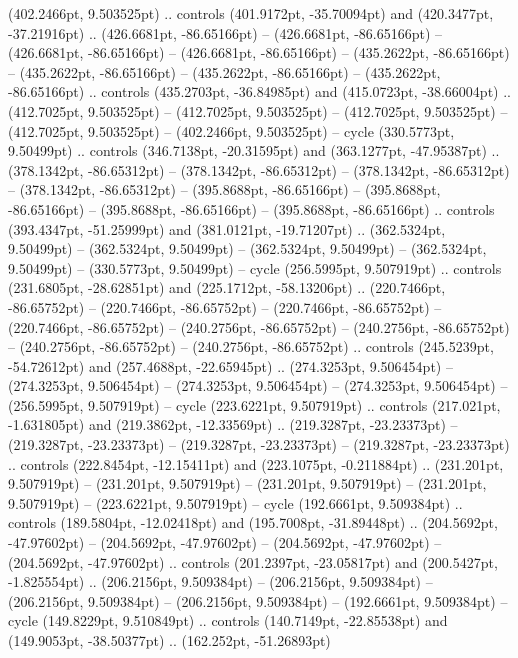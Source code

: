 (402.2466pt, 9.503525pt) .. controls (401.9172pt, -35.70094pt) and (420.3477pt, -37.21916pt) .. (426.6681pt, -86.65166pt)
 -- (426.6681pt, -86.65166pt)
 -- (426.6681pt, -86.65166pt)
 -- (426.6681pt, -86.65166pt)
 -- (435.2622pt, -86.65166pt)
 -- (435.2622pt, -86.65166pt)
 -- (435.2622pt, -86.65166pt)
 -- (435.2622pt, -86.65166pt) .. controls (435.2703pt, -36.84985pt) and (415.0723pt, -38.66004pt) .. (412.7025pt, 9.503525pt)
 -- (412.7025pt, 9.503525pt)
 -- (412.7025pt, 9.503525pt)
 -- (412.7025pt, 9.503525pt)
 -- (402.2466pt, 9.503525pt) -- cycle
(330.5773pt, 9.50499pt) .. controls (346.7138pt, -20.31595pt) and (363.1277pt, -47.95387pt) .. (378.1342pt, -86.65312pt)
 -- (378.1342pt, -86.65312pt)
 -- (378.1342pt, -86.65312pt)
 -- (378.1342pt, -86.65312pt)
 -- (395.8688pt, -86.65166pt)
 -- (395.8688pt, -86.65166pt)
 -- (395.8688pt, -86.65166pt)
 -- (395.8688pt, -86.65166pt) .. controls (393.4347pt, -51.25999pt) and (381.0121pt, -19.71207pt) .. (362.5324pt, 9.50499pt)
 -- (362.5324pt, 9.50499pt)
 -- (362.5324pt, 9.50499pt)
 -- (362.5324pt, 9.50499pt)
 -- (330.5773pt, 9.50499pt) -- cycle
(256.5995pt, 9.507919pt) .. controls (231.6805pt, -28.62851pt) and (225.1712pt, -58.13206pt) .. (220.7466pt, -86.65752pt)
 -- (220.7466pt, -86.65752pt)
 -- (220.7466pt, -86.65752pt)
 -- (220.7466pt, -86.65752pt)
 -- (240.2756pt, -86.65752pt)
 -- (240.2756pt, -86.65752pt)
 -- (240.2756pt, -86.65752pt)
 -- (240.2756pt, -86.65752pt) .. controls (245.5239pt, -54.72612pt) and (257.4688pt, -22.65945pt) .. (274.3253pt, 9.506454pt)
 -- (274.3253pt, 9.506454pt)
 -- (274.3253pt, 9.506454pt)
 -- (274.3253pt, 9.506454pt)
 -- (256.5995pt, 9.507919pt) -- cycle
(223.6221pt, 9.507919pt) .. controls (217.021pt, -1.631805pt) and (219.3862pt, -12.33569pt) .. (219.3287pt, -23.23373pt)
 -- (219.3287pt, -23.23373pt)
 -- (219.3287pt, -23.23373pt)
 -- (219.3287pt, -23.23373pt) .. controls (222.8454pt, -12.15411pt) and (223.1075pt, -0.211884pt) .. (231.201pt, 9.507919pt)
 -- (231.201pt, 9.507919pt)
 -- (231.201pt, 9.507919pt)
 -- (231.201pt, 9.507919pt)
 -- (223.6221pt, 9.507919pt) -- cycle
(192.6661pt, 9.509384pt) .. controls (189.5804pt, -12.02418pt) and (195.7008pt, -31.89448pt) .. (204.5692pt, -47.97602pt)
 -- (204.5692pt, -47.97602pt)
 -- (204.5692pt, -47.97602pt)
 -- (204.5692pt, -47.97602pt) .. controls (201.2397pt, -23.05817pt) and (200.5427pt, -1.825554pt) .. (206.2156pt, 9.509384pt)
 -- (206.2156pt, 9.509384pt)
 -- (206.2156pt, 9.509384pt)
 -- (206.2156pt, 9.509384pt)
 -- (192.6661pt, 9.509384pt) -- cycle
(149.8229pt, 9.510849pt) .. controls (140.7149pt, -22.85538pt) and (149.9053pt, -38.50377pt) .. (162.252pt, -51.26893pt)
